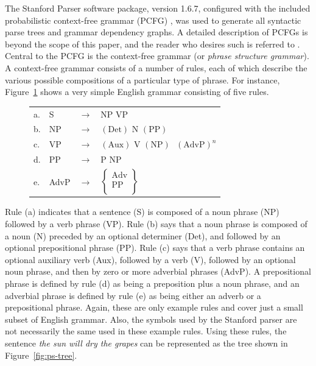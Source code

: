 \documentclass[main.tex]{subfiles}
\begin{document}
The Stanford Parser software package, version 1.6.7, configured with the included probabilistic context-free grammar (PCFG) \citep*{klein-manning-pcfg:2003}, was used to generate all syntactic parse trees and grammar dependency graphs. A detailed description of PCFGs is beyond the scope of this paper, and the reader who desires such is referred to \citet{booth:1973}. Central to the PCFG is the context-free grammar (or \textit{phrase structure grammar}). A context-free grammar consists of a number of rules, each of which describe the various possible compositions of a particular type of phrase. For instance, Figure~\ref{fig:ps-rules} shows a very simple English grammar consisting of five rules.
\begin{figure}
\centering
\begin{tabular}{l l l l}
a. & S & $\rightarrow$ & $\text{NP} \text{ VP}$\\ 
b. & NP & $\rightarrow$ & $(\text{Det}) \text{ N } (\text{PP})$\\
c. & VP & $\rightarrow$ & $(\text{Aux}) \text{ V } (\text{NP}) \text{ } (\text{AdvP})^n$\\
d. & PP & $\rightarrow$ & $\text{P } \text{NP}$\\
e. & AdvP &  $\rightarrow$ & $\begin{Bmatrix}
\text{Adv} \\ \text{PP} \\
\end{Bmatrix} $
\end{tabular}
\label{fig:ps-rules}
\end{figure}
Rule (a) indicates that a sentence (S) is composed of a noun phrase (NP) followed by a verb phrase (VP). Rule (b) says that a noun phrase is composed of a noun (N) preceded by an optional determiner (Det), and followed by an optional prepositional phrase (PP). Rule (c) says that a verb phrase contains an optional auxiliary verb (Aux), followed by a verb (V), followed by an optional noun phrase, and then by zero or more adverbial phrases (AdvP). A prepositional phrase is defined by rule (d) as being a preposition plus a noun phrase, and an adverbial phrase is defined by rule (e) as being either an adverb or a prepositional phrase. Again, these are only example rules and cover just a small subset of English grammar. Also, the symbols used by the Stanford parser are not necessarily the same used in these example rules. Using these rules, the sentence \textit{the sun will dry the grapes} can be represented as the tree shown in Figure~\ref{fig:ps-tree}.
\end{document}
